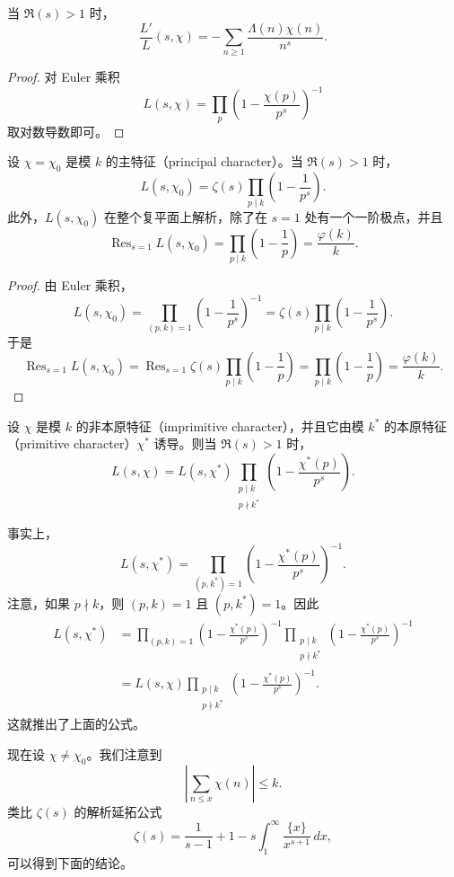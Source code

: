 \begin{corollary}
	当 $\Re(s)>1$ 时，
	\[
		\frac{L'}{L}(s,\chi)
		=
		-\sum_{n\geq 1}\frac{\Lambda(n)\chi(n)}{n^s}.
	\]
\end{corollary}

\begin{proof}
	对 Euler 乘积
	\[
		L(s,\chi)=\prod_p\left(1-\frac{\chi(p)}{p^s}\right)^{-1}
	\]
	取对数导数即可。
\end{proof}

\begin{lemma}
	设 $\chi=\chi_0$ 是模 $k$ 的主特征（principal character）。当 $\Re(s)>1$ 时，
	\[
		L(s,\chi_0)=\zeta(s)\prod_{p\mid k}\left(1-\frac{1}{p^s}\right).
	\]
	此外，$L(s,\chi_0)$ 在整个复平面上解析，除了在 $s=1$ 处有一个一阶极点，并且
	\[
		\operatorname{Res}_{s=1}L(s,\chi_0)
		=
		\prod_{p\mid k}\left(1-\frac{1}{p}\right)
		=
		\frac{\varphi(k)}{k}.
	\]
\end{lemma}

\begin{proof}
	由 Euler 乘积，
	\[
		L(s,\chi_0)
		=
		\prod_{(p,k)=1}\left(1-\frac{1}{p^s}\right)^{-1}
		=
		\zeta(s)\prod_{p\mid k}\left(1-\frac{1}{p^s}\right).
	\]
	于是
	\[
		\operatorname{Res}_{s=1}L(s,\chi_0)
		=
		\operatorname{Res}_{s=1}\zeta(s)
		\prod_{p\mid k}\left(1-\frac{1}{p}\right)
		=
		\prod_{p\mid k}\left(1-\frac{1}{p}\right)
		=
		\frac{\varphi(k)}{k}.
	\]
\end{proof}

设 $\chi$ 是模 $k$ 的非本原特征（imprimitive character），并且它由模 $k^*$ 的本原特征（primitive character）$\chi^*$ 诱导。则当 $\Re(s)>1$ 时，
\[
	L(s,\chi)
	=
	L(s,\chi^*)\prod_{\substack{p\mid k\\ p\nmid k^*}}
	\left(1-\frac{\chi^*(p)}{p^s}\right).
\]

事实上，
\[
	L(s,\chi^*)
	=
	\prod_{(p,k^*)=1}\left(1-\frac{\chi^*(p)}{p^s}\right)^{-1}.
\]
注意，如果 $p\nmid k$，则 $(p,k)=1$ 且 $(p,k^*)=1$。因此
\[
\begin{aligned}
	L(s,\chi^*)
	&=
	\prod_{(p,k)=1}\left(1-\frac{\chi^*(p)}{p^s}\right)^{-1}
	\prod_{\substack{p\mid k\\ p\nmid k^*}}
	\left(1-\frac{\chi^*(p)}{p^s}\right)^{-1}  \\
	&=
	L(s,\chi)
	\prod_{\substack{p\mid k\\ p\nmid k^*}}
	\left(1-\frac{\chi^*(p)}{p^s}\right)^{-1}.
\end{aligned}
\]
这就推出了上面的公式。

现在设 $\chi\neq \chi_0$。我们注意到
\[
	\left|\sum_{n\leq x}\chi(n)\right|\leq k.
\]
类比 $\zeta(s)$ 的解析延拓公式
\[
	\zeta(s)
	=
	\frac{1}{s-1}+1
	-s\int_1^\infty \frac{\{x\}}{x^{s+1}}\,dx,
\]
可以得到下面的结论。

